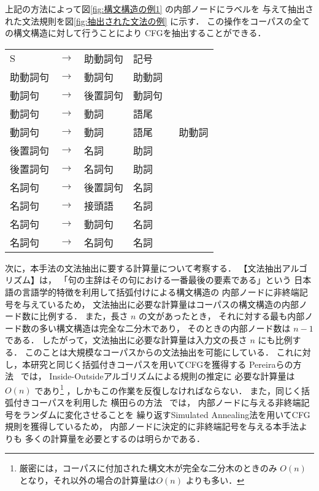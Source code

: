 \bigskip
上記の方法によって図\ref{fig:構文構造の例1} の内部ノードにラベルを
与えて抽出された文法規則を図\ref{fig:抽出された文法の例} に示す．
この操作をコーパスの全ての構文構造に対して行うことにより
CFGを抽出することができる．

\begin{center}
  \small
  \smallskip
  \begin{tabular}{lcll}
    S        & $\rightarrow$ & 助動詞句 & 記号 \\
    助動詞句 & $\rightarrow$ & 動詞句 & 助動詞 \\
    動詞句   & $\rightarrow$ & 後置詞句 & 動詞句 \\
    動詞句   & $\rightarrow$ & 動詞 & 語尾 \\
    動詞句   & $\rightarrow$ & 動詞 & 語尾 ~~~~ 助動詞 \\
    後置詞句 & $\rightarrow$ & 名詞 & 助詞 \\
    後置詞句 & $\rightarrow$ & 名詞句 & 助詞 \\
    名詞句   & $\rightarrow$ & 後置詞句 & 名詞 \\
    名詞句   & $\rightarrow$ & 接頭語 & 名詞 \\
    名詞句   & $\rightarrow$ & 動詞句 & 名詞 \\
    名詞句   & $\rightarrow$ & 名詞句 & 名詞 \\
  \end{tabular}

  \bigskip
\end{center}

次に，本手法の文法抽出に要する計算量について考察する．
【文法抽出アルゴリズム】は，
「句の主辞はその句における一番最後の要素である」という
日本語の言語学的特徴を利用して括弧付けによる構文構造の
内部ノードに非終端記号を与えているため，
文法抽出に必要な計算量はコーパスの構文構造の内部ノード数に比例する．
また，長さ $n$ の文があったとき，
それに対する最も内部ノード数の多い構文構造は完全な二分木であり，
そのときの内部ノード数は $n-1$ である．
したがって，文法抽出に必要な計算量は入力文の長さ $n$ にも比例する．
このことは大規模なコーパスからの文法抽出を可能にしている．
これに対し，本研究と同じく括弧付きコーパスを用いてCFGを獲得する
Pereiraらの方法~\cite{pereira92a,schabes93b} では，
Inside-Outsideアルゴリズムによる規則の推定に
必要な計算量は$O(n)$ であり\footnote{
  厳密には，コーパスに付加された構文木が完全な二分木のときのみ
  $O(n)$ となり，それ以外の場合の計算量は$O(n)$ よりも多い．}
，しかもこの作業を反復しなければならない．
また，同じく括弧付きコーパスを利用した
横田らの方法~\cite{yokota96a} では，
内部ノードに与える非終端記号をランダムに変化させることを
繰り返すSimulated Annealing法を用いてCFG規則を獲得しているため，
内部ノードに決定的に非終端記号を与える本手法よりも
多くの計算量を必要とするのは明らかである．
